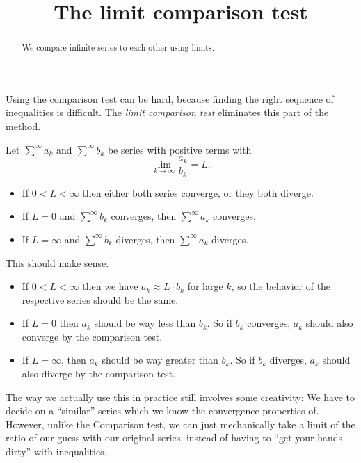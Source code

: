 \documentclass{ximera}
\title[Dig-In:]{The limit comparison test}
\begin{document}
\begin{abstract}
We compare infinite series to each other using limits.
\end{abstract}
\maketitle

Using the comparison test can be hard, because finding the right
sequence of inequalities is difficult.  The \textit{limit comparison test}
eliminates this part of the method.

\begin{theorem}
  Let $\sum^\infty a_k$ and $\sum^\infty b_k$ be series with positive
  terms with
  \[
  \lim_{k \to \infty} \frac{a_k}{b_k} = L.
  \]
  \begin{itemize}
  \item If $0<L<\infty$ then either both series converge, or they both diverge.
  \item If $L=0$ and $\sum^\infty b_k$ converges, then $\sum^\infty a_k$ converges.
  \item If $L=\infty$ and $\sum^\infty b_k$ diverges, then $\sum^\infty a_k$ diverges.
  \end{itemize}
\end{theorem}

This should make sense.
\begin{itemize}
\item If $0<L<\infty$ then we have $a_k \approx L \cdot b_k$ for large
  $k$, so the behavior of the respective series should be the same.
\item If $L=0$ then $a_k$ should be way less than $b_k$.  So if $b_k$
  converges, $a_k$ should also converge by the comparison test.
\item If $L=\infty$, then $a_k$ should be way greater than $b_k$. So
  if $b_k$ diverges, $a_k$ should also diverge by the comparison test.
\end{itemize}

The way we actually use this in practice still involves some
creativity: We have to decide on a ``similar'' series which we know
the convergence properties of.  However, unlike the Comparison test,
we can just mechanically take a limit of the ratio of our guess with
our original series, instead of having to ``get your hands dirty''
with inequalities.
\end{document}
